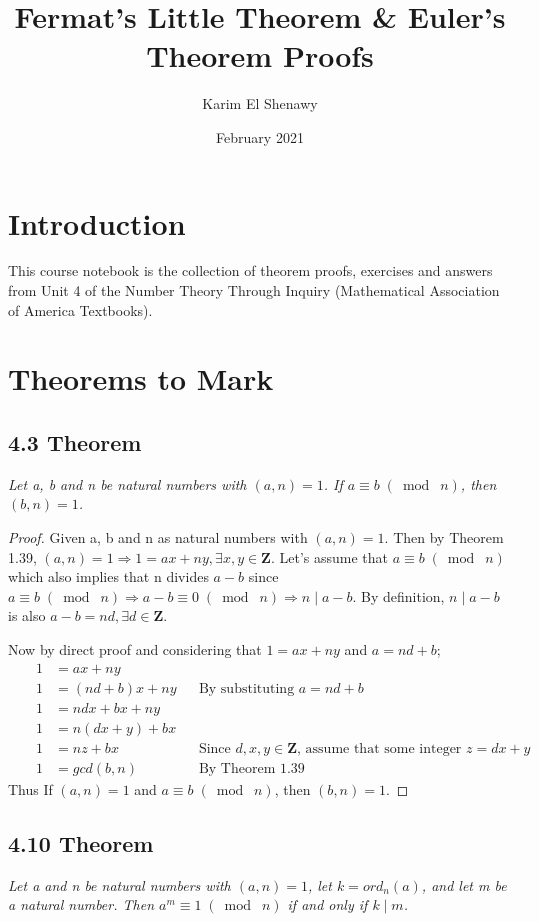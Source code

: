 \documentclass{article}
\title{Fermat's Little Theorem \& Euler's Theorem Proofs}
\author{Karim El Shenawy}
\date{February 2021}
\begin{document}
\maketitle

\section*{Introduction}
This course notebook is the collection of theorem proofs, exercises and answers from Unit 4 of the Number Theory Through Inquiry (Mathematical Association of America Textbooks).

\section*{Theorems to Mark}

\subsection*{4.3 Theorem} 
\quad \textit{Let a, b and n be natural numbers with $(a, n) = 1$. If $a \equiv b \;(\bmod\; n)$, then $(b, n) = 1$.}

\begin{proof}
Given a, b and n as natural numbers with $(a, n) = 1$. Then by Theorem 1.39, $(a, n) = 1 \Longrightarrow 1 = ax + ny, \exists x, y \in \mathbf{Z}$. Let's assume that $a \equiv b \;(\bmod\; n)$ which also implies that n divides $a - b$ since $a \equiv b \;(\bmod\; n) \Longrightarrow a - b \equiv 0 \;(\bmod\; n) \Longrightarrow n \mid a - b$. By definition, $n \mid a - b$ is also $ a - b = nd, \exists d \in \mathbf{Z}$.

Now by direct proof and considering that $1 = ax + ny$ and $a= nd + b$;
\begin{align*}
    && 1 &= ax + ny&&\\
    && 1 &= (nd + b)x + ny&& \text{By substituting $a= nd + b$}\\
    && 1 &= ndx + bx + ny&&\\
    && 1 &= n(dx + y) + bx&&\\
    && 1 &= nz + bx&& \text{Since $d,x,y \in \mathbf{Z}$, assume that some integer $z = dx + y$}\\
    && 1 &= gcd(b, n)&& \text{By Theorem 1.39}
\end{align*}
Thus If $(a,n) = 1$ and $a \equiv b \;(\bmod\; n)$, then $(b, n) = 1$.
\end{proof}

\subsection*{4.10 Theorem} 
\quad \textit{Let a and n be natural numbers with $(a, n) = 1$, let $k = ord_n(a)$, and let m be a natural number. Then $a^m \equiv 1 \;(\bmod\; n)$ if and only if $k \mid m$.}
\end{document}
